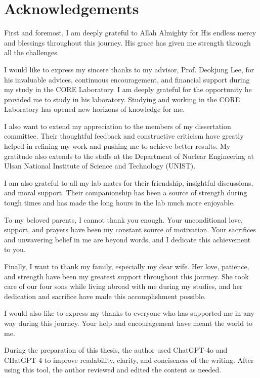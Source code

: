 \section*{\hfill \Large Acknowledgements \hfill}
First and foremost, I am deeply grateful to Allah Almighty for His endless mercy and blessings throughout this journey. His grace has given me strength through all the challenges.

I would like to express my sincere thanks to my advisor, Prof. Deokjung Lee, for his invaluable advices, continuous encouragement, and financial support during my study in the CORE Laboratory. I am deeply grateful for the opportunity he provided me to study in his laboratory. Studying and working in the CORE Laboratory has opened new horizons of knowledge for me.

I also want to extend my appreciation to the members of my dissertation committee. Their thoughtful feedback and constructive criticism have greatly helped in refining my work and pushing me to achieve better results. My gratitude also extends to the staffs at the Department of Nuclear Engineering at Ulsan National Institute of Science and Technology (UNIST).

I am also grateful to all my lab mates for their friendship, insightful discussions, and moral support. Their companionship has been a source of strength during tough times and has made the long hours in the lab much more enjoyable. 

To my beloved parents, I cannot thank you enough. Your unconditional love, support, and prayers have been my constant source of motivation. Your sacrifices and unwavering belief in me are beyond words, and I dedicate this achievement to you.

Finally, I want to thank my family, especially my dear wife. Her love, patience, and strength have been my greatest support throughout this journey. She took care of our four sons while living abroad with me during my studies, and her dedication and sacrifice have made this accomplishment possible.

I would also like to express my thanks to everyone who has supported me in any way during this journey. Your help and encouragement have meant the world to me.

During the preparation of this thesis, the author used ChatGPT-4o and CHatGPT-4 to improve readability, clarity, and conciseness of the writing. After using this tool, the author reviewed and edited the content as needed.
\clearpage